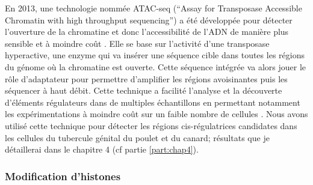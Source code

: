 En 2013, une technologie nommée ATAC-seq (“Assay for Transposase Accessible Chromatin with high throughput sequencing”) a été développée pour détecter l’ouverture de la chromatine et donc l’accessibilité de l’ADN de manière plus sensible et à moindre coût \citep{buenrostro_transposition_2013}. Elle se base sur l’activité d’une transposase hyperactive, une enzyme qui va insérer une séquence cible dans toutes les régions du génome où la chromatine est ouverte. Cette séquence intégrée va alors jouer le rôle d'adaptateur pour permettre d’amplifier les régions avoisinantes puis les séquencer à haut débit. Cette technique a facilité l’analyse et la découverte d’éléments régulateurs dans de multiples échantillons en permettant notamment les expérimentations à moindre coût sur un faible nombre de cellules \citep{daugherty_chromatin_2017}. Nous avons utilisé cette technique pour détecter les régions \gls{cis}-régulatrices candidates dans les cellules du tubercule génital du poulet et du canard; résultats que je détaillerai dans le chapitre 4 (cf partie \ref{part:chap4}). 

\subsubsection{Modification d’histones}
\label{subsubsec:histone}

